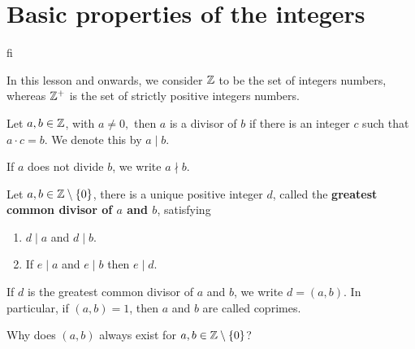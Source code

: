 \documentclass[11pt,a4paper]{article}
\begin{document}
\def\contador{1}


\section{Basic properties of the integers}

fi

In this lesson and onwards, we consider $\mathbb{Z}$ to be the set of integers numbers, whereas $\mathbb{Z}^{+}$ is the set of strictly positive integers numbers.

\begin{defi}
Let $a,b\in \mathbb{Z}$, with $a\neq 0,$ then $a$ is a divisor of $b$ if there is an integer $c$ such that $a\cdot c=b$. We denote this by $a\mid b.$ 
\end{defi}

\begin{rem}
    If $a$ does not divide $b$, we write $a\nmid b$.
\end{rem}

\begin{teo}
    Let $a,b\in \mathbb{Z}\setminus\{0\}$, there is a unique positive integer $d$, called the \textbf{greatest common divisor of $a$ and $b$}, satisfying 
    \begin{enumerate}
        \item $d\mid a$ and $d\mid b.$
        \item If $e\mid a$ and $e\mid b$ then $e\mid d.$
    \end{enumerate}
\end{teo}

\begin{rem}
    If $d$ is the greatest common divisor of $a$ and $b$, we write $d=(a,b).$ In particular, if $(a,b)=1$, then $a$ and $b$ are called coprimes.
\end{rem}

\begin{que}
    Why does $(a,b)$ always exist for $a,b\in \mathbb{Z}\setminus\{0\}$?
\end{que}
\end{document}
